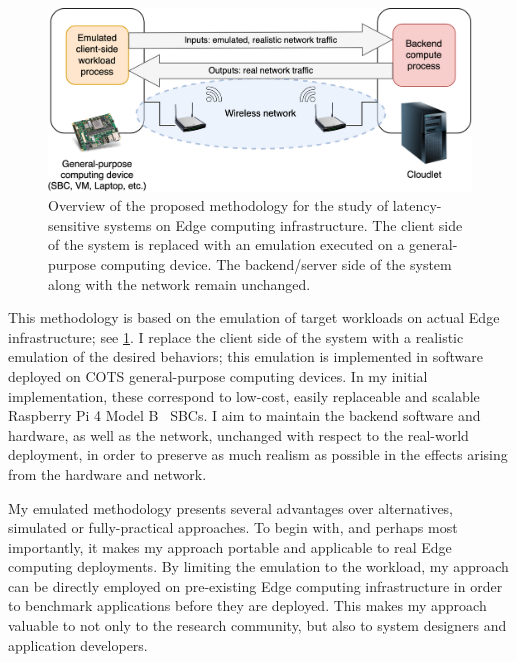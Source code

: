\begin{figure}
    \centering
    \includegraphics[width=.8\textwidth]{Figs/methodology}
    \caption{%
        Overview of the proposed methodology for the study of latency-sensitive systems on Edge computing infrastructure.
        The  client side of the system is replaced with an emulation executed on a general-purpose computing device.
        The backend/server side of the system along with the network remain unchanged.
    }\label{fig:methodology}
\end{figure}

This methodology is based on the emulation of target workloads on actual Edge infrastructure;
see \cref{fig:methodology}.
I replace the client side of the system with a realistic emulation of the desired behaviors;
this emulation is implemented in software deployed on \gls{COTS} general-purpose computing devices.
In my initial implementation, these correspond to low-cost, easily replaceable and scalable Raspberry Pi 4 Model B~\cite{raspberrypi} \glspl{SBC}.
I aim to maintain the backend software and hardware, as well as the network, unchanged with respect to the real-world deployment, in order to preserve as much realism as possible in the effects arising from the hardware and network.

My emulated methodology presents several advantages over alternatives, simulated or fully-practical approaches.
To begin with, and perhaps most importantly, it makes my approach portable and applicable to real Edge computing deployments.
By limiting the emulation to the workload, my approach can be directly employed on pre-existing Edge computing infrastructure in order to benchmark applications before they are deployed.
This makes my approach valuable to not only to the research community, but also to system designers and application developers.

